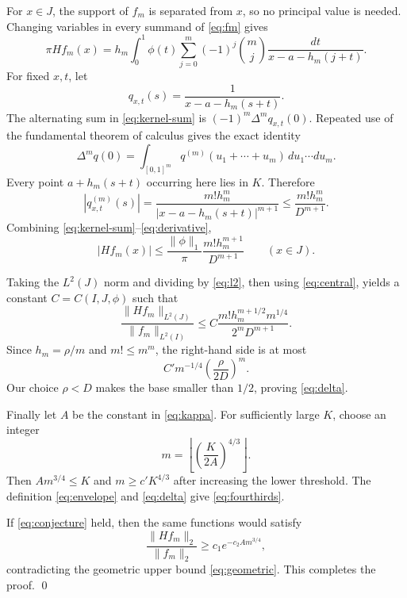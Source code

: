 \documentclass[11pt]{article}
\begin{document}
For $x\in J$, the support of $f_m$ is separated from $x$, so no principal
value is needed.  Changing variables in every summand of \eqref{eq:fm} gives
\begin{equation}\label{eq:kernel-sum}
 \pi Hf_m(x)=h_m\int_0^1\phi(t)
 \sum_{j=0}^m(-1)^j\binom mj
 \frac{dt}{x-a-h_m(j+t)}.
\end{equation}
For fixed $x,t$, let
\[
 q_{x,t}(s)=\frac1{x-a-h_m(s+t)}.
\]
The alternating sum in \eqref{eq:kernel-sum} is
$(-1)^m\Delta^m q_{x,t}(0)$.  Repeated use of the fundamental theorem of
calculus gives the exact identity
\begin{equation}\label{eq:difference}
 \Delta^m q(0)=\int_{[0,1]^m}
 q^{(m)}(u_1+\cdots+u_m)\,du_1\cdots du_m.
\end{equation}
Every point $a+h_m(s+t)$ occurring here lies in $K$.  Therefore
\begin{equation}\label{eq:derivative}
 |q_{x,t}^{(m)}(s)|
 =\frac{m!h_m^m}{|x-a-h_m(s+t)|^{m+1}}
 \le\frac{m!h_m^m}{D^{m+1}}.
\end{equation}
Combining \eqref{eq:kernel-sum}--\eqref{eq:derivative},
\begin{equation}\label{eq:pointwise}
 |Hf_m(x)|
 \le\frac{\|\phi\|_1}{\pi}
      \frac{m!h_m^{m+1}}{D^{m+1}}
 \qquad(x\in J).
\end{equation}

Taking the $L^2(J)$ norm and dividing by \eqref{eq:l2}, then using
\eqref{eq:central}, yields a constant $C=C(I,J,\phi)$ such that
\begin{equation}\label{eq:ratio-bound}
 \frac{\|Hf_m\|_{L^2(J)}}{\|f_m\|_{L^2(I)}}
 \le C\frac{m!h_m^{m+1/2}m^{1/4}}{2^mD^{m+1}}.
\end{equation}
Since $h_m=\rho/m$ and $m!\le m^m$, the right-hand side is at most
\begin{equation}\label{eq:geometric}
 C' m^{-1/4}\left(\frac{\rho}{2D}\right)^m.
\end{equation}
Our choice $\rho<D$ makes the base smaller than $1/2$, proving
\eqref{eq:delta}.

Finally let $A$ be the constant in \eqref{eq:kappa}.  For sufficiently large
$K$, choose an integer
\[
 m=\left\lfloor\left(\frac{K}{2A}\right)^{4/3}\right\rfloor.
\]
Then $Am^{3/4}\le K$ and $m\ge c'K^{4/3}$ after increasing the lower
threshold.  The definition \eqref{eq:envelope} and \eqref{eq:delta} give
\eqref{eq:fourthirds}.

If \eqref{eq:conjecture} held, then the same functions would satisfy
\[
 \frac{\|Hf_m\|_2}{\|f_m\|_2}
 \ge c_1e^{-c_2Am^{3/4}},
\]
contradicting the geometric upper bound \eqref{eq:geometric}.  This completes
the proof. \qed
\end{document}
